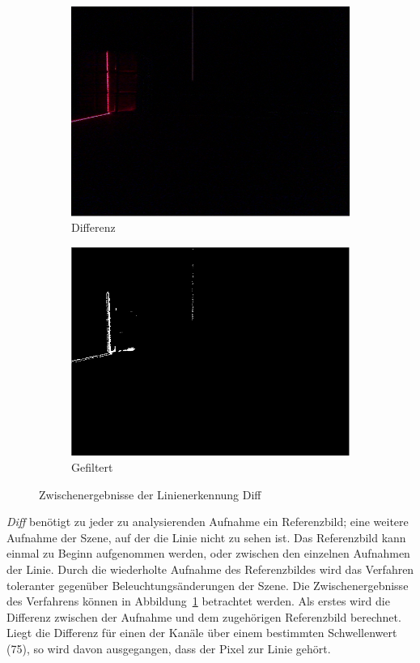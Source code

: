 \documentclass[ngerman,a4paper,parskip=half]{scrartcl}
\begin{document}
\begin{figure}
\begin{subfigure}{0.23\textwidth}
		\includegraphics[width=\textwidth]{includes/line_diff.png}
		\caption{Differenz}
	\end{subfigure}
	\hfill
	\begin{subfigure}{0.23\textwidth}
		\includegraphics[width=\textwidth]{includes/line_diff_filtered.png}
		\caption{Gefiltert}
	\end{subfigure}

	\caption{Zwischenergebnisse der Linienerkennung Diff}
	\label{fig:diff}
\end{figure}

\emph{Diff} benötigt zu jeder zu analysierenden Aufnahme ein Referenzbild; eine weitere Aufnahme der Szene, auf der die Linie nicht zu sehen ist. Das Referenzbild kann einmal zu Beginn aufgenommen werden, oder zwischen den einzelnen Aufnahmen der Linie. Durch die wiederholte Aufnahme des Referenzbildes wird das Verfahren toleranter gegenüber Beleuchtungsänderungen der Szene.
Die Zwischenergebnisse des Verfahrens können in Abbildung~\ref{fig:diff} betrachtet werden. Als erstes wird die Differenz zwischen der Aufnahme und dem zugehörigen Referenzbild berechnet.
Liegt die Differenz für einen der Kanäle über einem bestimmten Schwellenwert (75), so wird davon ausgegangen, dass der Pixel zur Linie gehört.
\end{document}
